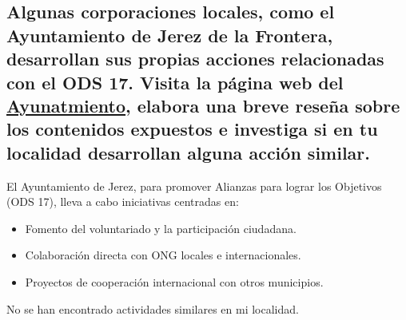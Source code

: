 
\fsection{\boldit{\textcolor{waveBlue2}{UTILIZA LAS TIC.}}} 
\subsection*{Algunas corporaciones locales, como el Ayuntamiento de Jerez de la Frontera, desarrollan sus propias acciones relacionadas con el ODS 17. Visita la página web del 
\href{www.jerez.es/webs-municipales/agenda-2030/objetivos/ods-17}{Ayunatmiento}, elabora una breve reseña sobre los contenidos expuestos e investiga si en tu localidad desarrollan alguna acción similar.}

\begin{solution}
El Ayuntamiento de Jerez, para promover Alianzas para lograr los Objetivos (ODS 17), lleva a cabo iniciativas centradas en:
\begin{itemize}
\item Fomento del voluntariado y la participación ciudadana.
\item Colaboración directa con ONG locales e internacionales.
\item Proyectos de cooperación internacional con otros municipios.
\end{itemize}
No se han encontrado actividades similares en mi localidad.
\end{solution}
